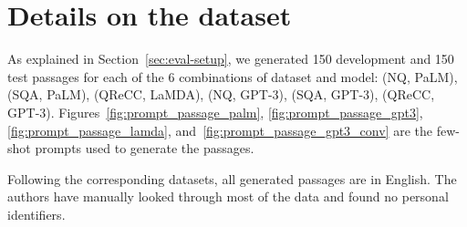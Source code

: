 \documentclass[11pt]{article}
\begin{document}
\section{Details on the dataset}

As explained in Section~\ref{sec:eval-setup}, we generated 150 development and 150 test passages for each of the 6 combinations of dataset and model: (NQ, PaLM), (SQA, PaLM), (QReCC, LaMDA), (NQ, GPT-3), (SQA, GPT-3), (QReCC, GPT-3).
Figures~\ref{fig:prompt_passage_palm}, \ref{fig:prompt_passage_gpt3}, \ref{fig:prompt_passage_lamda},  and~\ref{fig:prompt_passage_gpt3_conv} are the few-shot prompts used to generate the passages.

Following the corresponding datasets, all generated passages are in English. The authors have manually looked through most of the data and found no personal identifiers.
\end{document}

